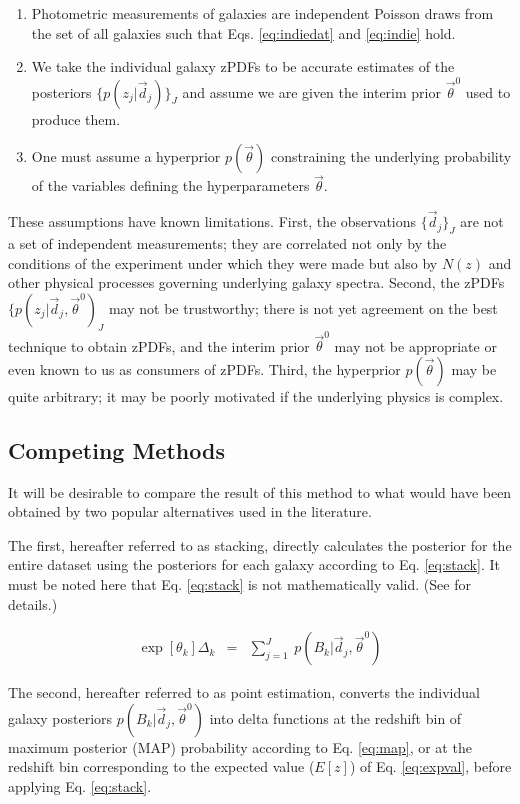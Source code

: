 \documentclass[preprint]{aastex}
\begin{document}
\begin{enumerate}
\item Photometric measurements of galaxies are independent Poisson draws from the set of all galaxies such that Eqs. \ref{eq:indiedat} and \ref{eq:indie} hold.
\item We take the individual galaxy zPDFs to be accurate estimates of the posteriors $\{p(z_{j}|\vec{d}_{j})\}_{J}$ and assume we are given the interim prior $\vec{\theta}^{0}$ used to produce them.
\item One must assume a hyperprior $p(\vec{\theta})$ constraining the underlying probability of the variables defining the hyperparameters $\vec{\theta}$.
\end{enumerate}

These assumptions have known limitations.  First, the observations $\{\vec{d}_{j}\}_{J}$ are not a set of independent measurements; they are correlated not only by the conditions of the experiment under which they were made but also by $N(z)$ and other physical processes governing underlying galaxy spectra.  Second, the zPDFs $\{p(z_{j}|\vec{d}_{j},\vec{\theta}^{0})_{J}$ may not be trustworthy; there is not yet agreement on the best technique to obtain zPDFs, and the interim prior $\vec{\theta}^{0}$ may not be appropriate or even known to us as consumers of zPDFs.  Third, the hyperprior $p(\vec{\theta})$ may be quite arbitrary; it may be poorly motivated if the underlying physics is complex.

\clearpage
\subsection{Competing Methods}
\label{sec:sheldon}

It will be desirable to compare the result of this method to what would have been obtained by two popular alternatives used in the literature.   

The first, hereafter referred to as stacking, directly calculates the posterior for the entire dataset using the posteriors for each galaxy according to Eq. \ref{eq:stack}.  \citep{lim08}  It must be noted here that Eq. \ref{eq:stack} is not mathematically valid.  (See \citet{hog12} for details.)  

\begin{eqnarray}
\label{eq:stack}
\exp[\theta_{k}]\Delta_{k} &=& \sum_{j=1}^{J}\ p(B_{k}|\vec{d}_{j},\vec{\theta}^{0})
\end{eqnarray}

The second, hereafter referred to as point estimation, converts the individual galaxy posteriors $p(B_{k}|\vec{d}_{j},\vec{\theta}^{0})$ into delta functions at the redshift bin of maximum posterior (MAP) probability according to Eq. \ref{eq:map}, or at the redshift bin corresponding to the expected value ($E[z]$) of Eq. \ref{eq:expval}, before applying Eq. \ref{eq:stack}.
\end{document}
